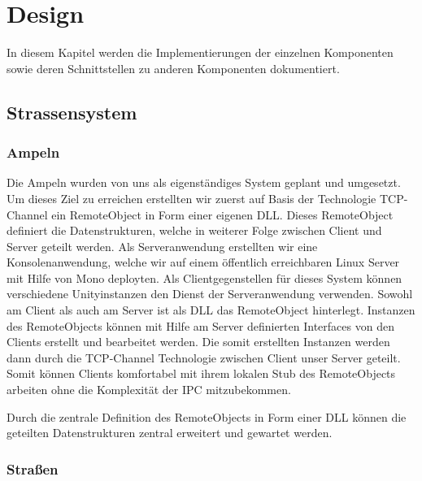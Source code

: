 
\chapter{Design}
\label{Design}

In diesem Kapitel werden die Implementierungen der einzelnen Komponenten sowie deren Schnittstellen zu anderen Komponenten dokumentiert.



\thispagestyle{standard}
\pagestyle{standard}

\section{Strassensystem}
\label{Strassensystem}

\subsection{Ampeln}

Die Ampeln wurden von uns als eigenständiges System geplant und umgesetzt. Um dieses Ziel zu erreichen erstellten wir zuerst auf Basis der Technologie TCP-Channel ein RemoteObject in Form einer eigenen DLL. Dieses RemoteObject definiert die Datenstrukturen, welche in weiterer Folge zwischen Client und Server geteilt werden. Als Serveranwendung erstellten wir eine Konsolenanwendung, welche wir auf einem öffentlich erreichbaren Linux Server mit Hilfe von Mono deployten. Als Clientgegenstellen für dieses System können verschiedene Unityinstanzen den Dienst der Serveranwendung verwenden. Sowohl am Client als auch am Server ist als DLL das RemoteObject hinterlegt. Instanzen des RemoteObjects können mit Hilfe am Server definierten Interfaces von den Clients erstellt und bearbeitet werden. Die somit erstellten Instanzen werden dann durch die TCP-Channel Technologie zwischen Client unser Server geteilt. Somit können Clients komfortabel mit ihrem lokalen Stub des RemoteObjects arbeiten ohne die Komplexität der IPC mitzubekommen. 

Durch die zentrale Definition des RemoteObjects in Form einer DLL können die geteilten Datenstrukturen zentral erweitert und gewartet werden.

\subsection{Straßen}

